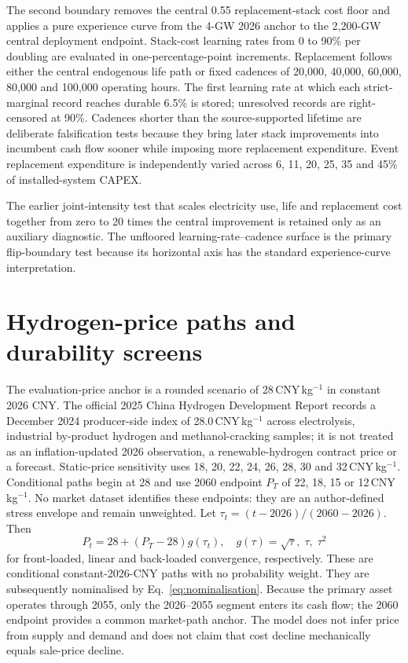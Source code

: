 \documentclass[pdflatex,sn-nature]{sn-jnl}
\begin{document}
The second boundary removes the central 0.55 replacement-stack cost floor and applies a pure experience curve from the 4-GW 2026 anchor to the 2,200-GW central deployment endpoint. Stack-cost learning rates from 0 to 90\% per doubling are evaluated in one-percentage-point increments. Replacement follows either the central endogenous life path or fixed cadences of 20,000, 40,000, 60,000, 80,000 and 100,000 operating hours. The first learning rate at which each strict-marginal record reaches durable 6.5\% is stored; unresolved records are right-censored at 90\%. Cadences shorter than the source-supported lifetime are deliberate falsification tests because they bring later stack improvements into incumbent cash flow sooner while imposing more replacement expenditure. Event replacement expenditure is independently varied across 6, 11, 20, 25, 35 and 45\% of installed-system CAPEX.

The earlier joint-intensity test that scales electricity use, life and replacement cost together from zero to 20 times the central improvement is retained only as an auxiliary diagnostic. The unfloored learning-rate--cadence surface is the primary flip-boundary test because its horizontal axis has the standard experience-curve interpretation.

\section{Hydrogen-price paths and durability screens}\label{sec:price}

The evaluation-price anchor is a rounded scenario of 28\,CNY\,kg$^{-1}$ in constant 2026 CNY. The official 2025 China Hydrogen Development Report records a December 2024 producer-side index of 28.0\,CNY\,kg$^{-1}$ across electrolysis, industrial by-product hydrogen and methanol-cracking samples; it is not treated as an inflation-updated 2026 observation, a renewable-hydrogen contract price or a forecast\cite{nea2025hydrogen}. Static-price sensitivity uses 18, 20, 22, 24, 26, 28, 30 and 32\,CNY\,kg$^{-1}$. Conditional paths begin at 28 and use 2060 endpoint $P_T$ of 22, 18, 15 or 12\,CNY\,kg$^{-1}$. No market dataset identifies these endpoints: they are an author-defined stress envelope and remain unweighted. Let $\tau_t=(t-2026)/(2060-2026)$. Then
\begin{equation}
P_t=28+(P_T-28)g(\tau_t), \quad
g(\tau)=\sqrt{\tau},\;\tau,\;\tau^2
\label{eq:pricepaths}
\end{equation}
for front-loaded, linear and back-loaded convergence, respectively. These are conditional constant-2026-CNY paths with no probability weight. They are subsequently nominalised by Eq.~\ref{eq:nominalisation}. Because the primary asset operates through 2055, only the 2026--2055 segment enters its cash flow; the 2060 endpoint provides a common market-path anchor. The model does not infer price from supply and demand and does not claim that cost decline mechanically equals sale-price decline.
\end{document}
